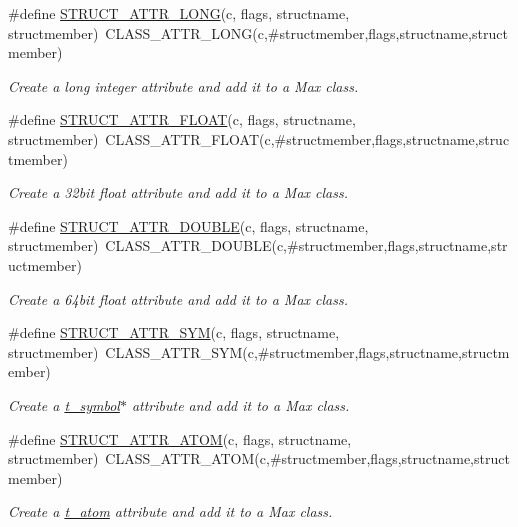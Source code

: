 \begin{DoxyCompactItemize}
\#define \hyperlink{group__attr_ga7316b283e5b148d614773511dbd52ecc}{STRUCT\_\-ATTR\_\-LONG}(c, flags, structname, structmember)~CLASS\_\-ATTR\_\-LONG(c,\#structmember,flags,structname,structmember)
\begin{DoxyCompactList}\small\item\em Create a long integer attribute and add it to a Max class. \item\end{DoxyCompactList}\item 
\#define \hyperlink{group__attr_ga91cdbfa68b1aba7de92405221131d770}{STRUCT\_\-ATTR\_\-FLOAT}(c, flags, structname, structmember)~CLASS\_\-ATTR\_\-FLOAT(c,\#structmember,flags,structname,structmember)
\begin{DoxyCompactList}\small\item\em Create a 32bit float attribute and add it to a Max class. \item\end{DoxyCompactList}\item 
\#define \hyperlink{group__attr_ga8d3bad9fc716cf6bd2dd6052e96a115b}{STRUCT\_\-ATTR\_\-DOUBLE}(c, flags, structname, structmember)~CLASS\_\-ATTR\_\-DOUBLE(c,\#structmember,flags,structname,structmember)
\begin{DoxyCompactList}\small\item\em Create a 64bit float attribute and add it to a Max class. \item\end{DoxyCompactList}\item 
\#define \hyperlink{group__attr_ga34e7280cc9833e6be9c25b545d75dfa5}{STRUCT\_\-ATTR\_\-SYM}(c, flags, structname, structmember)~CLASS\_\-ATTR\_\-SYM(c,\#structmember,flags,structname,structmember)
\begin{DoxyCompactList}\small\item\em Create a \hyperlink{structt__symbol}{t\_\-symbol}$\ast$ attribute and add it to a Max class. \item\end{DoxyCompactList}\item 
\#define \hyperlink{group__attr_gac3eb53c213e4ab85625f9e4e10b20521}{STRUCT\_\-ATTR\_\-ATOM}(c, flags, structname, structmember)~CLASS\_\-ATTR\_\-ATOM(c,\#structmember,flags,structname,structmember)
\begin{DoxyCompactList}\small\item\em Create a \hyperlink{structt__atom}{t\_\-atom} attribute and add it to a Max class. \item\end{DoxyCompactList}\item 

\end{DoxyCompactItemize}

